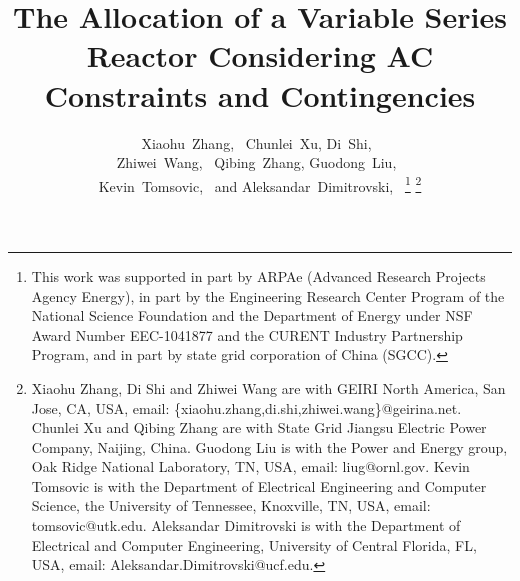 \documentclass[journal]{IEEEtran}
\begin{document}
%
\title{The Allocation of a Variable Series Reactor Considering AC Constraints and Contingencies}
%
%
%

\author{Xiaohu~Zhang,~
        Chunlei~Xu, 
        Di~Shi,~ \\
        Zhiwei~Wang,~
        Qibing~Zhang,
        Guodong~Liu,~ \\
        Kevin~Tomsovic,~
        and Aleksandar~Dimitrovski,~
\thanks{This work was supported in part by ARPAe (Advanced Research Projects
	Agency Energy), in part by the Engineering Research Center Program
	of the National Science Foundation and the Department of Energy under
	NSF Award Number EEC-1041877 and the CURENT Industry Partnership Program, and in part by state grid corporation of China (SGCC).}
\thanks{Xiaohu Zhang, Di Shi and Zhiwei Wang are with GEIRI North America, San Jose, CA, USA, email: \{xiaohu.zhang,di.shi,zhiwei.wang\}@geirina.net. Chunlei Xu and Qibing Zhang are with State Grid Jiangsu Electric Power Company, Naijing, China. Guodong Liu is with the Power and Energy group, Oak Ridge National Laboratory, TN, USA, email: liug@ornl.gov. Kevin Tomsovic is with the Department of Electrical Engineering and Computer Science, the University of Tennessee, Knoxville, TN, USA, email: tomsovic@utk.edu. Aleksandar Dimitrovski is with the Department of Electrical and Computer Engineering, University of Central Florida, FL, USA, email: Aleksandar.Dimitrovski@ucf.edu.}}%
\end{document}
